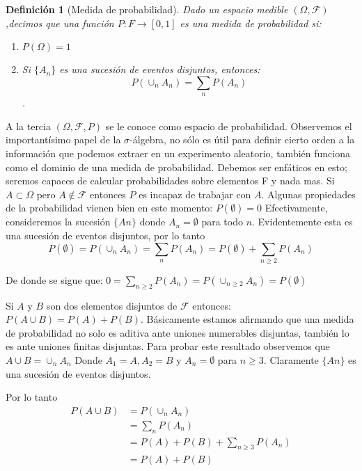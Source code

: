 \documentclass[14pt]{extreport}
\newtheorem{definition}{Definición}[chapter]
\begin{document}
\begin{definition}[Medida de probabilidad]
  Dado un espacio medible $(\Omega, \mathcal{F})$,decimos que una función $P : F \rightarrow [0,1]$ es una medida de probabilidad si:

  \begin{enumerate}
    \item $P(\Omega) = 1$
    \item Si $\{A_n \}$ es una sucesión de eventos disjuntos, entonces:
          $$P\left(\cup_n A_n \right) = \sum_n P(A_n)$$.
  \end{enumerate}
\end{definition}

A la tercia $(\Omega, \mathcal{F}, P)$ se le conoce como espacio de probabilidad. Observemos el importantísimo papel de la $\sigma$-álgebra, no sólo es útil para definir cierto orden a la información que podemos extraer en un experimento aleatorio, también funciona como el dominio de una medida de probabilidad. Debemos ser enfáticos en esto; seremos capaces de calcular probabilidades sobre elementos F y nada mas. Si $A \subset \Omega$ pero $A \notin \mathcal{F}$ entonces $P$ es incapaz de trabajar con $A$. Algunas propiedades de la probabilidad vienen bien en este momento: $P(\emptyset) = 0$ Efectivamente, consideremos la sucesión $\{An \}$ donde $A_n = \emptyset$ para todo $n$. Evidentemente esta es una sucesión de eventos disjuntos, por lo tanto
$$
  P(\emptyset) = P\left(\cup_n A_n\right) = \sum_n P(A_n ) = P(\emptyset) + \sum_{n\geq2} P(A_n )
$$

De donde se sigue que: $0 = \sum_{n\geq 2} P(A_n) = P\left(\cup_{n\geq 2} A_n\right) = P(\emptyset)$

Si $A$ y $B$ son dos elementos disjuntos de $\mathcal{F}$ entonces: $P\left(A \cup B\right) = P(A) + P(B)$. Básicamente estamos afirmando que una medida de probabilidad no solo es aditiva ante uniones numerables disjuntas, también lo es ante uniones finitas disjuntas. Para probar este resultado observemos que $A \cup B = \cup_n A_n$ Donde $A_1 = A, A_2 = B$ y $A_n = \emptyset$ para $n \geq 3$. Claramente $\{An \}$ es una sucesión de eventos disjuntos.

Por lo tanto
\begin{equation*}
  \begin{split}
    P(A \cup B) & = P\left(\cup_n A_n \right)\\
    & = \sum_n P(A_n) \\
    & = P(A) + P(B) + \sum_{n\geq 3} P(A_n) \\
    & = P(A) + P(B)
  \end{split}
\end{equation*}
\end{document}
